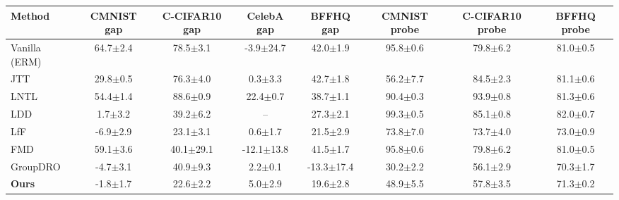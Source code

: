 \begin{tabular}{lccccccc}
\toprule
Method & CMNIST gap & C-CIFAR10 gap & CelebA gap & BFFHQ gap & CMNIST probe & C-CIFAR10 probe & BFFHQ probe \\
\midrule
Vanilla (ERM) & 64.7{\scriptsize$\pm$2.4} & 78.5{\scriptsize$\pm$3.1} & -3.9{\scriptsize$\pm$24.7} & 42.0{\scriptsize$\pm$1.9} & 95.8{\scriptsize$\pm$0.6} & 79.8{\scriptsize$\pm$6.2} & 81.0{\scriptsize$\pm$0.5} \\
JTT & 29.8{\scriptsize$\pm$0.5} & 76.3{\scriptsize$\pm$4.0} & 0.3{\scriptsize$\pm$3.3} & 42.7{\scriptsize$\pm$1.8} & 56.2{\scriptsize$\pm$7.7} & 84.5{\scriptsize$\pm$2.3} & 81.1{\scriptsize$\pm$0.6} \\
LNTL & 54.4{\scriptsize$\pm$1.4} & 88.6{\scriptsize$\pm$0.9} & 22.4{\scriptsize$\pm$0.7} & 38.7{\scriptsize$\pm$1.1} & 90.4{\scriptsize$\pm$0.3} & 93.9{\scriptsize$\pm$0.8} & 81.3{\scriptsize$\pm$0.6} \\
LDD & 1.7{\scriptsize$\pm$3.2} & 39.2{\scriptsize$\pm$6.2} & – & 27.3{\scriptsize$\pm$2.1} & 99.3{\scriptsize$\pm$0.5} & 85.1{\scriptsize$\pm$0.8} & 82.0{\scriptsize$\pm$0.7} \\
LfF & -6.9{\scriptsize$\pm$2.9} & 23.1{\scriptsize$\pm$3.1} & 0.6{\scriptsize$\pm$1.7} & 21.5{\scriptsize$\pm$2.9} & 73.8{\scriptsize$\pm$7.0} & 73.7{\scriptsize$\pm$4.0} & 73.0{\scriptsize$\pm$0.9} \\
FMD & 59.1{\scriptsize$\pm$3.6} & 40.1{\scriptsize$\pm$29.1} & -12.1{\scriptsize$\pm$13.8} & 41.5{\scriptsize$\pm$1.7} & 95.8{\scriptsize$\pm$0.6} & 79.8{\scriptsize$\pm$6.2} & 81.0{\scriptsize$\pm$0.5} \\
GroupDRO & -4.7{\scriptsize$\pm$3.1} & 40.9{\scriptsize$\pm$9.3} & 2.2{\scriptsize$\pm$0.1} & -13.3{\scriptsize$\pm$17.4} & 30.2{\scriptsize$\pm$2.2} & 56.1{\scriptsize$\pm$2.9} & 70.3{\scriptsize$\pm$1.7} \\
\textbf{Ours} & -1.8{\scriptsize$\pm$1.7} & 22.6{\scriptsize$\pm$2.2} & 5.0{\scriptsize$\pm$2.9} & 19.6{\scriptsize$\pm$2.8} & 48.9{\scriptsize$\pm$5.5} & 57.8{\scriptsize$\pm$3.5} & 71.3{\scriptsize$\pm$0.2} \\
\bottomrule
\end{tabular}

